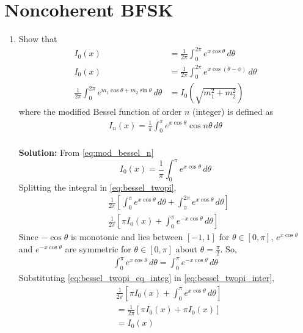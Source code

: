 \documentclass[journal,10pt,twocolumn]{IEEEtran}
\providecommand{\brak}[1]{\ensuremath{\left(#1\right)}}
\newcommand{\solution}{\noindent \textbf{Solution: }}
\begin{document}
\section{Noncoherent BFSK}
\begin{enumerate}
\item
Show that
%
\begin{align}
\label{eq:bessel_twopi}
I_{0}(x) &= \frac{1}{2\pi}\int_{0}^{2\pi}e^{x\cos\theta}\,d\theta \\
\label{eq:bessel_phi}
I_{0}(x) &= \frac{1}{2\pi}\int_{0}^{2\pi}e^{x\cos\brak{\theta-\phi}}\,d\theta \\
\label{eq:bessel_addition}
\frac{1}{2\pi}\int_{0}^{2\pi}e^{m_1\cos\theta + m_2\sin\theta}\,d\theta &= I_0\brak{\sqrt{m_1^2+m_2^2}} 
\end{align}
%
where the modified Bessel function of order $n$ (integer) is defined as 
%
\begin{align}
\label{eq:mod_bessel_n}
I_{n}(x) = \frac{1}{\pi}\int_{0}^{\pi}e^{x\cos\theta}\cos n\theta\,d\theta
\end{align}\\
\solution From \eqref{eq:mod_bessel_n}
\begin{equation}
	I_{0}(x) = \frac{1}{\pi}\int_{0}^{\pi}e^{x\cos\theta} \,d\theta
	\label{eq:mod_bessel_zero}
\end{equation}
Splitting the integral in \eqref{eq:bessel_twopi},
\begin{align}
	& \frac{1}{2\pi}\left[\int_{0}^{\pi}e^{x\cos\theta}\,d\theta+\int_{\pi}^{2\pi}e^{x\cos\theta}\,d\theta\right]\\
	\label{eq:bessel_twopi_inter}
	& \frac{1}{2\pi}\left[\pi I_{0}(x)+\int_{0}^{\pi}e^{-x\cos\theta}\,d\theta\right]
\end{align}
Since $-\cos \theta$ is monotonic and lies between $[-1,1]$ for $\theta \in [0,\pi]$, $e^{x\cos\theta}$ and $e^{-x\cos\theta}$ are symmetric %
for $\theta \in [0,\pi]$ about $\theta = \frac{\pi}{2}$. So,
\begin{align}
	\label{eq:bessel_twopi_eq_integ}
	\int_{0}^{\pi}e^{x\cos\theta}\,d\theta = \int_{0}^{\pi}e^{-x\cos\theta}\,d\theta
\end{align}
Substituting \eqref{eq:bessel_twopi_eq_integ} in \eqref{eq:bessel_twopi_inter},
\begin{align*}
	& \frac{1}{2\pi}\left[\pi I_{0}(x)+\int_{0}^{\pi}e^{x\cos\theta}\,d\theta\right]\\
	&= \frac{1}{2\pi}\left[\pi I_{0}(x)+\pi I_{0}(x)\right]\\
	&= I_{0}(x)

\end{align*}
\end{enumerate}
\end{document}
